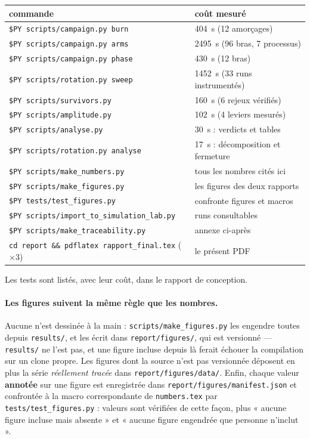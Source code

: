 \documentclass[11pt,a4paper]{article}
\newcommand{\code}[1]{\texttt{#1}}
\begin{document}
\begin{center}\footnotesize
\begin{tabular}{@{}p{8.6cm}p{5.0cm}@{}}
\toprule
\textbf{commande} & \textbf{coût mesuré} \\
\midrule
\code{\$PY scripts/campaign.py burn} & 404~s (12 amorçages) \\
\code{\$PY scripts/campaign.py arms} & 2495~s (96 bras, 7 processus) \\
\code{\$PY scripts/campaign.py phase} & 430~s (12 bras) \\
\code{\$PY scripts/rotation.py sweep} & 1452~s (33 runs instrumentés) \\
\code{\$PY scripts/survivors.py} & 160~s (6 rejeux vérifiés) \\
\code{\$PY scripts/amplitude.py} & 102~s (4 leviers mesurés) \\
\code{\$PY scripts/analyse.py} & 30~s : verdicts et tables \\
\code{\$PY scripts/rotation.py analyse} & 17~s : décomposition et fermeture \\
\code{\$PY scripts/make\_numbers.py} & tous les nombres cités ici \\
\code{\$PY scripts/make\_figures.py} & les \nombreFigures{} figures des deux rapports \\
\code{\$PY tests/test\_figures.py} & confronte figures et macros \\
\code{\$PY scripts/import\_to\_simulation\_lab.py} & runs consultables \\
\code{\$PY scripts/make\_traceability.py} & annexe ci-après \\
\code{cd report \&\& pdflatex rapport\_final.tex} ($\times 3$) & le présent PDF \\
\bottomrule
\end{tabular}
\end{center}

\noindent Les tests sont listés, avec leur coût, dans le rapport de conception.

\paragraph{Les figures suivent la même règle que les nombres.} Aucune n'est
dessinée à la main : \code{scripts/make\_figures.py} les engendre toutes depuis
\code{results/}, et les écrit dans \code{report/figures/}, qui est versionné
--- \code{results/} ne l'est pas, et une figure incluse depuis là ferait échouer
la compilation sur un clone propre. Les figures dont la source n'est pas
versionnée déposent en plus la série \emph{réellement tracée} dans
\code{report/figures/data/}. Enfin, chaque valeur \textbf{annotée} sur une
figure est enregistrée dans \code{report/figures/manifest.json} et confrontée à
la macro correspondante de \code{numbers.tex} par
\code{tests/test\_figures.py} : \nombreValeursControlees{} valeurs sont
vérifiées de cette façon, plus « aucune figure incluse mais absente » et
« aucune figure engendrée que personne n'inclut ».
\end{document}
